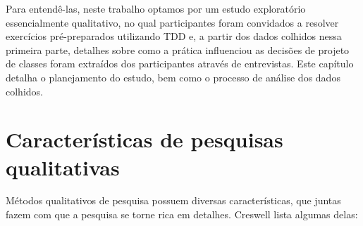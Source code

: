Para entendê-las, neste trabalho optamos por um estudo exploratório
essencialmente qualitativo,
no qual participantes foram convidados a resolver exercícios 
pré-preparados utilizando TDD e, a partir 
dos dados colhidos nessa primeira parte, detalhes sobre como a prática influenciou as 
decisões de projeto de classes foram extraídos dos participantes através de 
entrevistas.
Este capítulo detalha o planejamento do estudo, bem como o processo 
de análise dos dados colhidos.


\section{Características de pesquisas qualitativas}

Métodos qualitativos de pesquisa possuem diversas características, que juntas fazem
com que a pesquisa se torne rica em detalhes. Creswell \cite{creswell} lista
algumas delas:

